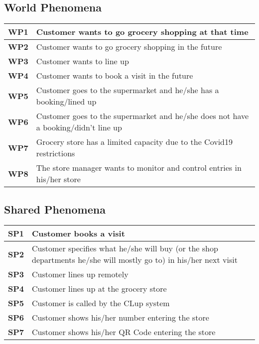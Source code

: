\subsection{World Phenomena} %
\begin{center}
    {\renewcommand{\arraystretch}{2}%
    \begin{tabular}{L{2cm}L{12cm}}
        \hline
        \textbf{WP1} & Customer wants to go grocery shopping at that time \\
        \hline
        \textbf{WP2} & Customer wants to go grocery shopping in the future \\
        \hline
        \textbf{WP3} & Customer wants to line up \\
        \hline
        \textbf{WP4} & Customer wants to book a visit in the future \\
        \hline
        \textbf{WP5} & Customer goes to the supermarket and he/she has a booking/lined up \\
        \hline
        \textbf{WP6} & Customer goes to the supermarket and he/she does not have a booking/didn't line up \\
        \hline
        \textbf{WP7} & Grocery store has a limited capacity due to the Covid19 restrictions \\
        \hline
        \textbf{WP8} & The store manager wants to monitor and control entries in his/her store \\
        \hline
    \end{tabular}}
\end{center}

\subsection{Shared Phenomena}
\begin{center}
    {\renewcommand{\arraystretch}{2}%
    \begin{tabular}{L{2cm}L{12cm}}
        \hline
        \textbf{SP1} & Customer books a visit \\
        \hline
        \textbf{SP2} & Customer specifies what he/she will buy (or the shop departments he/she will mostly go to) in his/her next visit \\
        \hline
        \textbf{SP3} & Customer lines up remotely \\
        \hline
        \textbf{SP4} & Customer lines up at the grocery store \\
        \hline
        \textbf{SP5} & Customer is called by the CLup system \\
        \hline
        \textbf{SP6} & Customer shows his/her number entering the store \\
        \hline
        \textbf{SP7} & Customer shows his/her QR Code entering the store \\
        \hline
    \end{tabular}}
\end{center}


